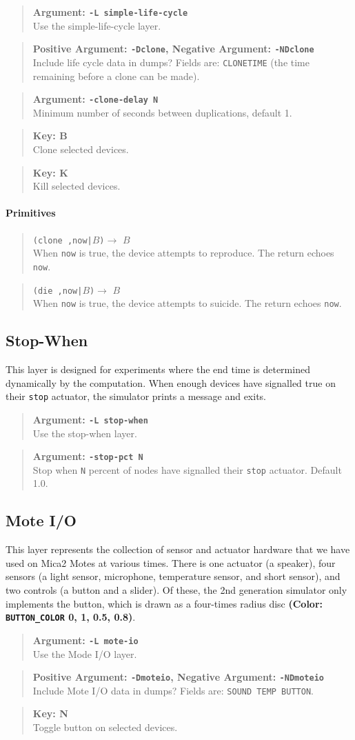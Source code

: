\documentclass{article}
\newcommand\var[1]{{\tt #1}}
\newcommand\key[1]{{\bf #1}}
\newcommand\simarg[2]{\begin{quote} {\bf Argument: \var{#1}} \\ #2 \end{quote}}
\newcommand\simkey[2]{\begin{quote} {\bf Key: \key{#1}} \\ #2 \end{quote}}
\newcommand\simPMarg[3]{
  \begin{quote}
    {\bf Positive Argument: \var{#1}, Negative Argument: \var{#2}} \\ #3
  \end{quote}
}
\newcommand\color[5]{{\bf (Color: {\tt #1} #2, #3, #4, #5)}} %
\newcommand\function[3]
{\begin{quote}{\tt #1}$\rightarrow$ \type{#2} \\ #3 \end{quote}}
\newcommand\type[1]{$#1$}
\begin{document}
\simarg{-L simple-life-cycle}{Use the simple-life-cycle layer.}
\simPMarg{-Dclone}{-NDclone}{Include life cycle data in dumps?
  Fields are: \var{CLONETIME} (the time remaining before a clone can be made).}
\simarg{-clone-delay N}{Minimum number of seconds between duplications,
  default 1.}
\simkey{B}{Clone selected devices.}
\simkey{K}{Kill selected devices.}

\paragraph{Primitives}

\function{(clone ,now|\type{B})}{B}{When \var{now} is true, the device
  attempts to reproduce.  The return echoes \var{now}.}

\function{(die ,now|\type{B})}{B}{When \var{now} is true, the device
  attempts to suicide.  The return echoes \var{now}.}


\subsection{Stop-When}

This layer is designed for experiments where the end time is
determined dynamically by the computation.  When enough devices have
signalled true on their \var{stop} actuator, the simulator prints a
message and exits.

\simarg{-L stop-when}{Use the stop-when layer.}
\simarg{-stop-pct N}{Stop when \var{N} percent of nodes have signalled
  their \var{stop} actuator.  Default 1.0.}



\subsection{Mote I/O}

This layer represents the collection of sensor and actuator hardware
that we have used on Mica2 Motes at various times.  There is one actuator
(a speaker), four sensors (a light sensor, microphone, temperature sensor,
and short sensor), and two controls (a button and a slider).  Of these,
the 2nd generation simulator only implements the button, which is
drawn as a four-times radius disc \color{BUTTON\_COLOR}{0}{1}{0.5}{0.8}.

\simarg{-L mote-io}{Use the Mode I/O layer.}
\simPMarg{-Dmoteio}{-NDmoteio}{Include Mote I/O data in dumps?
  Fields are: \var{SOUND TEMP BUTTON}.}
\simkey{N}{Toggle button on selected devices.}
\end{document}
